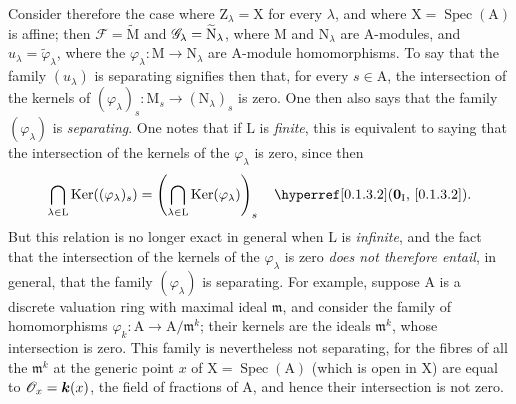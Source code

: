 \begin{env}[11.9.4]
\label{IV.11.9.4}
Consider therefore the case where $\mathrm{Z}_\lambda=\mathrm{X}$ for every $\lambda$, and where $\mathrm{X}=\operatorname{Spec}(\mathrm{A})$ is affine; then $\mathscr{F}=\widetilde{\mathrm{M}}$ and $\mathscr{G}_\lambda=\widetilde{\mathrm{N}}_\lambda$, where $\mathrm{M}$ and $\mathrm{N}_\lambda$ are $\mathrm{A}$-modules, and $u_\lambda=\widetilde{\varphi}_\lambda$, where the $\varphi_\lambda:\mathrm{M}\to\mathrm{N}_\lambda$ are $\mathrm{A}$-module homomorphisms.
To say that the family $(u_\lambda)$ is separating signifies then that, for every $s\in\mathrm{A}$, the intersection of the kernels of $(\varphi_\lambda)_s:\mathrm{M}_s\to(\mathrm{N}_\lambda)_s$ is zero.
One then also says that the family $(\varphi_\lambda)$ is \emph{separating}.
One notes that if $\mathrm{L}$ is \emph{finite}, this is equivalent to saying that the intersection of the kernels of the $\varphi_\lambda$ is zero, since then
\[
  \bigcap_{\lambda\in\mathrm{L}}\operatorname{Ker}((\varphi_\lambda)_s)
  =\left(\bigcap_{\lambda\in\mathrm{L}}\operatorname{Ker}(\varphi_\lambda)\right)_s
  \quad \sref[0\textsubscript{\mdseries I}]{0.1.3.2}.
\]
But this relation is no longer exact in general
when $\mathrm{L}$ is \emph{infinite}, and the fact that the intersection of the kernels of the $\varphi_\lambda$ is zero \emph{does not therefore entail},
in general, that the family $(\varphi_\lambda)$ is separating.
For example, suppose $\mathrm{A}$ is a discrete valuation ring with maximal ideal $\mathfrak{m}$, and consider the family of homomorphisms $\varphi_k:\mathrm{A}\to\mathrm{A}/\mathfrak{m}^k$; their kernels are the ideals $\mathfrak{m}^k$, whose intersection is zero. This family is nevertheless not separating, for the fibres of all the $\mathfrak{m}^k$ at the generic point $x$ of $\mathrm{X}=\operatorname{Spec}(\mathrm{A})$ (which is open in $\mathrm{X}$) are equal to $\mathscr{O}_x=\boldsymbol{k}(x)$, the field of fractions of $\mathrm{A}$, and hence their intersection is not zero.
\end{env}

